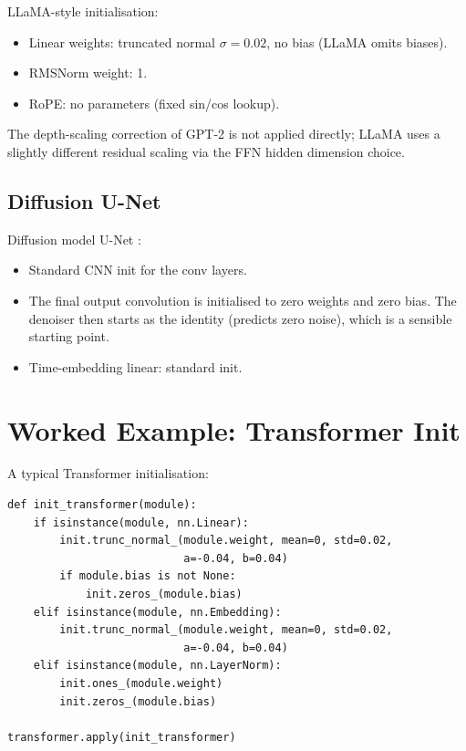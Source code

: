 LLaMA-style \cite{touvron_llama_2023} initialisation:
\begin{itemize}
  \item Linear weights: truncated normal $\sigma = 0.02$,
    no bias (LLaMA omits biases).
  \item RMSNorm weight: 1.
  \item RoPE: no parameters (fixed sin/cos lookup).
\end{itemize}

The depth-scaling correction of GPT-2 is not applied directly;
LLaMA uses a slightly different residual scaling via the FFN
hidden dimension choice.

\subsection{Diffusion U-Net}
\label{ssec:initialization:diffusion_recipe}

Diffusion model U-Net \cite{ho_ddpm_2020}:
\begin{itemize}
  \item Standard CNN init for the conv layers.
  \item The final output convolution is initialised to zero
    weights and zero bias. The denoiser then starts as the
    identity (predicts zero noise), which is a sensible
    starting point.
  \item Time-embedding linear: standard init.
\end{itemize}

\section{Worked Example: Transformer Init}
\label{sec:initialization:transformer_example}

A typical Transformer initialisation:

\begin{lstlisting}[style=lucid,language=LucidPython]
def init_transformer(module):
    if isinstance(module, nn.Linear):
        init.trunc_normal_(module.weight, mean=0, std=0.02,
                           a=-0.04, b=0.04)
        if module.bias is not None:
            init.zeros_(module.bias)
    elif isinstance(module, nn.Embedding):
        init.trunc_normal_(module.weight, mean=0, std=0.02,
                           a=-0.04, b=0.04)
    elif isinstance(module, nn.LayerNorm):
        init.ones_(module.weight)
        init.zeros_(module.bias)

transformer.apply(init_transformer)
\end{lstlisting}

